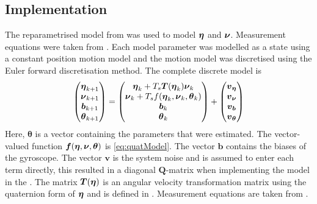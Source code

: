 \subsection{Implementation}\label{sec:KalmanEstimatorImpl}
The reparametrised model from  was used to model $\boldsymbol{\eta}$ and $\boldsymbol{\nu}$. Measurement equations were taken from . Each model parameter was modelled as a state using a constant position motion model and the motion model was discretised using the Euler forward discretisation method. The complete discrete model is
\begin{equation}
\label{eq:motionModelKalman}
\begin{pmatrix}
\boldsymbol{\eta}_{k+1}\\ 
\boldsymbol{\nu}_{k+1}\\
\boldsymbol{b}_{k+1}\\
\boldsymbol{\theta}_{k+1}
\end{pmatrix} = 
\begin{pmatrix}
\boldsymbol{\eta}_k + T_s \boldsymbol{T}(\boldsymbol{\eta}_k)\boldsymbol{\nu}_k\\
\boldsymbol{\nu}_k + T_s f(\boldsymbol{\eta}_k,\boldsymbol{\nu}_k,\boldsymbol{\theta}_k)\\
\boldsymbol{b}_k\\
\boldsymbol{\theta}_k
\end{pmatrix}
+ \begin{pmatrix}
\boldsymbol{v}_{\boldsymbol{\eta}}\\
\boldsymbol{v}_{\boldsymbol{\nu}}\\
\boldsymbol{v}_{\boldsymbol{b}}\\
\boldsymbol{v}_{\boldsymbol{\theta}}
\end{pmatrix}
\end{equation}
Here, $\boldsymbol{\theta}$ is a vector containing the parameters that were estimated. The vector-valued function $\boldsymbol{f}(\boldsymbol{\eta},\boldsymbol{\nu},\boldsymbol{\theta})$ is \eqref{eq:quatModel}. The vector $\boldsymbol{b}$  contains the biases of the gyroscope. The vector $\boldsymbol{v}$ is the system noise and is assumed to enter each term directly, this resulted in a diagonal $\boldsymbol{Q}$-matrix when implementing the model in the \abbrEKF. The matrix $\boldsymbol{T}(\boldsymbol{\eta})$ is an angular velocity transformation matrix using the quaternion form of $\boldsymbol{\eta}$ and is defined in . Measurement equations are taken from .

